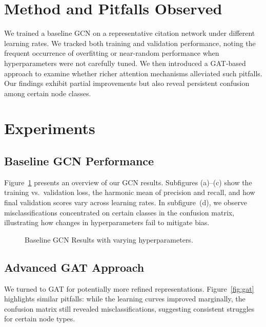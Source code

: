 \documentclass[11pt]{article}
\begin{document}
\section{Method and Pitfalls Observed}
We trained a baseline GCN on a representative citation network under different learning rates. We tracked both training and validation performance, noting the frequent occurrence of overfitting or near-random performance when hyperparameters were not carefully tuned. We then introduced a GAT-based approach to examine whether richer attention mechanisms alleviated such pitfalls. Our findings exhibit partial improvements but also reveal persistent confusion among certain node classes.

\section{Experiments}
\subsection{Baseline GCN Performance}
Figure~\ref{fig:baseline} presents an overview of our GCN results. Subfigures (a)--(c) show the training vs.\ validation loss, the harmonic mean of precision and recall, and how final validation scores vary across learning rates. In subfigure~(d), we observe misclassifications concentrated on certain classes in the confusion matrix, illustrating how changes in hyperparameters fail to mitigate bias.

\begin{figure}[t]
\centering
{}
\caption{Baseline GCN Results with varying hyperparameters.}
\label{fig:baseline}
\end{figure}

\subsection{Advanced GAT Approach}
We turned to GAT for potentially more refined representations. Figure~\ref{fig:gat} highlights similar pitfalls: while the learning curves improved marginally, the confusion matrix still revealed misclassifications, suggesting consistent struggles for certain node types.
\end{document}
